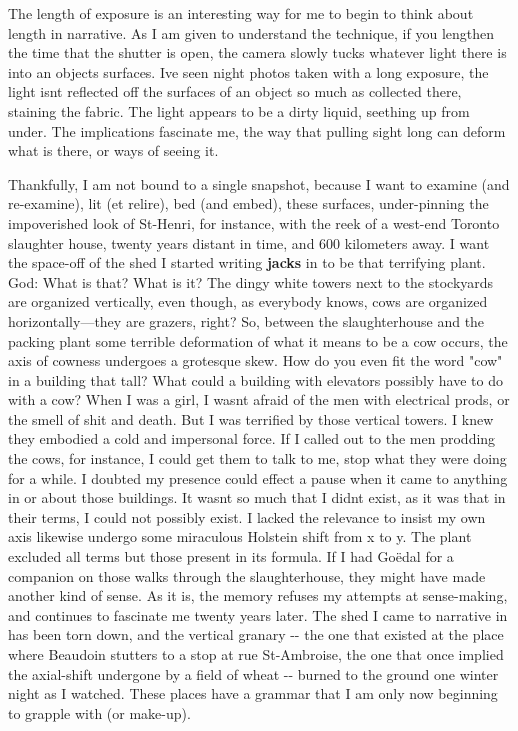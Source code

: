 The length of exposure is an interesting way for me to begin to think
about length in narrative. As I am given to understand the technique, if
you lengthen the time that the shutter is open, the camera slowly tucks
whatever light there is into an objects surfaces. Ive seen night photos
taken with a long exposure, the light isnt reflected off the surfaces of
an object so much as collected there, staining the fabric. The light
appears to be a dirty liquid, seething up from under. The implications
fascinate me, the way that pulling sight long can deform what is there,
or ways of seeing it.

Thankfully, I am not bound to a single snapshot, because I want to
examine (and re-examine), lit (et relire), bed (and embed), these
surfaces, under-pinning the impoverished look of St-Henri, for instance,
with the reek of a west-end Toronto slaughter house, twenty years
distant in time, and 600 kilometers away. I want the space-off of the
shed I started writing \textbf{jacks} in to be that terrifying plant.
God: What is that? What is it? The dingy white towers next to the
stockyards are organized vertically, even though, as everybody knows,
cows are organized horizontally---they are grazers, right? So, between
the slaughterhouse and the packing plant some terrible deformation of
what it means to be a cow occurs, the axis of cowness undergoes a
grotesque skew. How do you even fit the word "cow" in a building that
tall? What could a building with elevators possibly have to do with a
cow? When I was a girl, I wasnt afraid of the men with electrical prods,
or the smell of shit and death. But I was terrified by those vertical
towers. I knew they embodied a cold and impersonal force. If I called
out to the men prodding the cows, for instance, I could get them to talk
to me, stop what they were doing for a while. I doubted my presence
could effect a pause when it came to anything in or about those
buildings. It wasnt so much that I didnt exist, as it was that in their
terms, I could not possibly exist. I lacked the relevance to insist my
own axis likewise undergo some miraculous Holstein shift from x to y.
The plant excluded all terms but those present in its formula. If I had
Goëdal for a companion on those walks through the slaughterhouse, they
might have made another kind of sense. As it is, the memory refuses my
attempts at sense-making, and continues to fascinate me twenty years
later. The shed I came to narrative in has been torn down, and the
vertical granary -\/- the one that existed at the place where Beaudoin
stutters to a stop at rue St-Ambroise, the one that once implied the
axial-shift undergone by a field of wheat -\/- burned to the ground one
winter night as I watched. These places have a grammar that I am only
now beginning to grapple with (or make-up).

